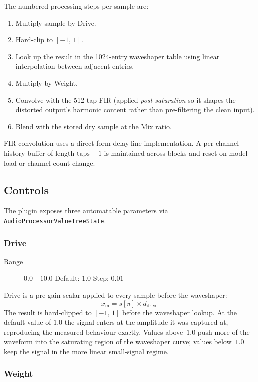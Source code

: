 \documentclass[11pt, letterpaper]{article}
\begin{document}
\noindent
The numbered processing steps per sample are:
\begin{enumerate}
  \item Multiply sample by Drive.
  \item Hard-clip to $[-1,\,1]$.
  \item Look up the result in the 1024-entry waveshaper table using
        linear interpolation between adjacent entries.
  \item Multiply by Weight.
  \item Convolve with the 512-tap FIR (applied \emph{post-saturation}
        so it shapes the distorted output's harmonic content rather than
        pre-filtering the clean input).
  \item Blend with the stored dry sample at the Mix ratio.
\end{enumerate}

FIR convolution uses a direct-form delay-line implementation.  A
per-channel history buffer of length $\text{taps} - 1$ is maintained
across blocks and reset on model load or channel-count change.

\subsection{Controls}
\label{sec:plugin_controls}

The plugin exposes three automatable parameters via
\texttt{AudioProcessorValueTreeState}.

\subsubsection{Drive}

\begin{description}
  \item[Range] $0.0 \;\text{--}\; 10.0$ \quad Default: $1.0$ \quad Step: $0.01$
\end{description}

Drive is a pre-gain scalar applied to every sample before the waveshaper:
\[
  x_{\text{in}} = s[n] \times d_{\text{drive}}
\]
The result is hard-clipped to $[-1,\,1]$ before the waveshaper lookup.
At the default value of $1.0$ the signal enters at the amplitude it was
captured at, reproducing the measured behaviour exactly.  Values
above~$1.0$ push more of the waveform into the saturating region of the
waveshaper curve; values below~$1.0$ keep the signal in the more linear
small-signal regime.

\subsubsection{Weight}
\end{document}
